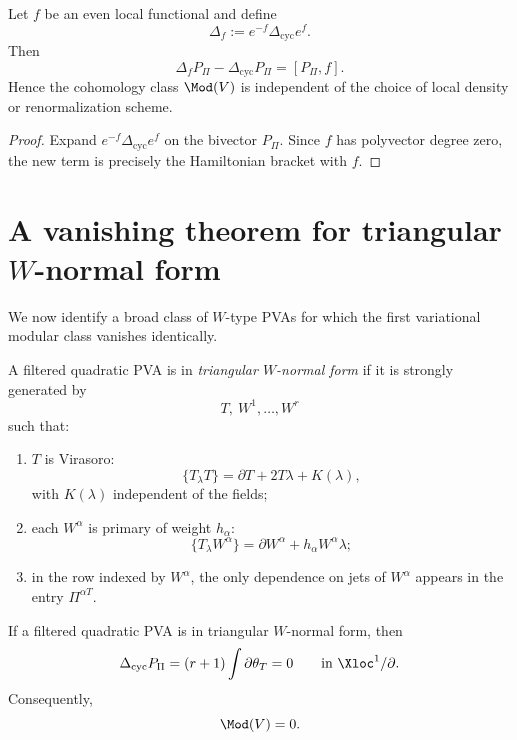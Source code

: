 \begin{lemma}\label{lem:gaugeind}
Let $f$ be an even local functional and define
\[
\Delta_f:=e^{-f}\Delta_{\mathrm{cyc}}e^f.
\]
Then
\[
\Delta_fP_\Pi-\Delta_{\mathrm{cyc}}P_\Pi=[P_\Pi,f].
\]
Hence the cohomology class $\Mod(V)$ is independent of the choice of local density
or renormalization scheme.
\end{lemma}

\begin{proof}
Expand $e^{-f}\Delta_{\mathrm{cyc}}e^f$ on the bivector $P_\Pi$. Since $f$ has polyvector
degree zero, the new term is precisely the Hamiltonian bracket with $f$.
\end{proof}

\section{A vanishing theorem for triangular $W$-normal form}

We now identify a broad class of $W$-type PVAs for which the first variational modular
class vanishes identically.

\begin{definition}
A filtered quadratic PVA is in \emph{triangular $W$-normal form} if it is strongly
generated by
\[
T,\ W^1,\dots,W^r
\]
such that:
\begin{enumerate}[leftmargin=2.4em]
\item $T$ is Virasoro:
\[
\{T_\lambda T\}=\partial T+2T\lambda+K(\lambda),
\]
with $K(\lambda)$ independent of the fields;
\item each $W^\alpha$ is primary of weight $h_\alpha$:
\[
\{T_\lambda W^\alpha\}=\partial W^\alpha+h_\alpha W^\alpha\lambda;
\]
\item in the row indexed by $W^\alpha$, the only dependence on jets of $W^\alpha$
appears in the entry $\Pi^{\alpha T}$.
\end{enumerate}
\end{definition}

\begin{theorem}\label{thm:triangular-vanishing}
If a filtered quadratic PVA is in triangular $W$-normal form, then
\[
\Delta_{\mathrm{cyc}}P_\Pi=(r+1)\int \partial\theta_T=0
\qquad\text{in }\Xloc^1/\partial.
\]
Consequently,
\[
\Mod(V)=0.
\]
\end{theorem}

